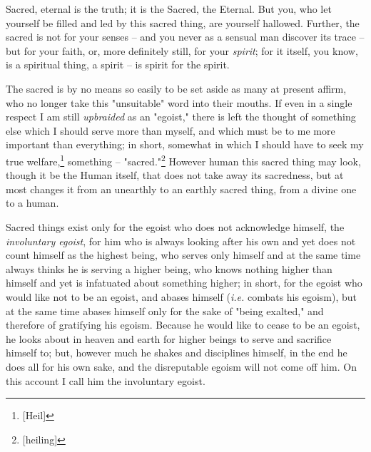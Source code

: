 \documentclass[a4paper]{book}
\begin{document}
Sacred, eternal is the truth; it is the Sacred, the Eternal. But you, who let 
yourself be filled and led by this sacred thing, are yourself hallowed. 
Further, the sacred is not for your senses -- and you never as a sensual man 
discover its trace -- but for your faith, or, more definitely still, for your 
\textit{spirit}; for it itself, you know, is a spiritual thing, a spirit -- is 
spirit for the spirit.

The sacred is by no means so easily to be set aside as many at present affirm, 
who no longer take this "{}unsuitable"{} word into their mouths. If even in a 
single respect I am still \textit{upbraided} as an "{}egoist,"{} there is left 
the thought of something else which I should serve more than myself, and which 
must be to me more important than everything; in short, somewhat in which I 
should have to seek my true welfare,\footnote{[Heil]} something -- 
"{}sacred."{}\footnote{[heiling]} However human this sacred thing may look, 
though it be the Human itself, that does not take away its sacredness, but at 
most changes it from an unearthly to an earthly sacred thing, from a divine 
one to a human.

Sacred things exist only for the egoist who does not acknowledge himself, the 
\textit{involuntary egoist}, for him who is always looking after his own and 
yet does not count himself as the highest being, who serves only himself and 
at the same time always thinks he is serving a higher being, who knows nothing 
higher than himself and yet is infatuated about something higher; in short, 
for the egoist who would like not to be an egoist, and abases himself 
(\textit{i.e.} combats his egoism), but at the same time abases himself only 
for the sake of "{}being exalted,"{} and therefore of gratifying his egoism. 
Because he would like to cease to be an egoist, he looks about in heaven and 
earth for higher beings to serve and sacrifice himself to; but, however much 
he shakes and disciplines himself, in the end he does all for his own sake, 
and the disreputable egoism will not come off him. On this account I call him 
the involuntary egoist.
\end{document}
